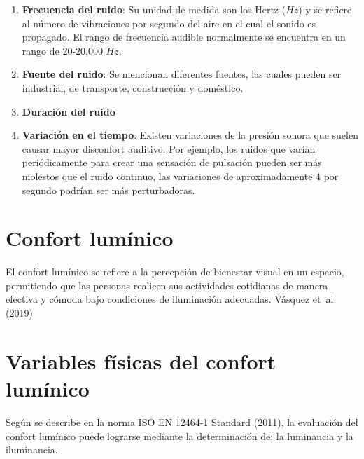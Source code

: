 \documentclass[
  letterpaper,
]{scrbook}
\begin{document}
\begin{enumerate}
\def\labelenumi{\arabic{enumi}.}
\item
  \textbf{Frecuencia del ruido}: Su unidad de medida son los Hertz
  (\(Hz\)) y se refiere al número de vibraciones por segundo del aire en
  el cual el sonido es propagado. El rango de frecuencia audible
  normalmente se encuentra en un rango de 20-20,000 \(Hz\).
\item
  \textbf{Fuente del ruido}: Se mencionan diferentes fuentes, las cuales
  pueden ser industrial, de transporte, construcción y doméstico.
\item
  \textbf{Duración del ruido}
\item
  \textbf{Variación en el tiempo}: Existen variaciones de la presión
  sonora que suelen causar mayor disconfort auditivo. Por ejemplo, los
  ruidos que varían periódicamente para crear una sensación de pulsación
  pueden ser más molestos que el ruido continuo, las variaciones de
  aproximadamente 4 por segundo podrían ser más perturbadoras.
\end{enumerate}

\section{Confort lumínico}\label{confort-lumuxednico}

El confort lumínico se refiere a la percepción de bienestar visual en un
espacio, permitiendo que las personas realicen sus actividades
cotidianas de manera efectiva y cómoda bajo condiciones de iluminación
adecuadas. Vásquez et~al. (2019)

\section{Variables físicas del confort
lumínico}\label{variables-fuxedsicas-del-confort-lumuxednico}

Según se describe en la norma ISO EN 12464-1 Standard (2011), la
evaluación del confort lumínico puede lograrse mediante la determinación
de: la luminancia y la iluminancia.
\end{document}
